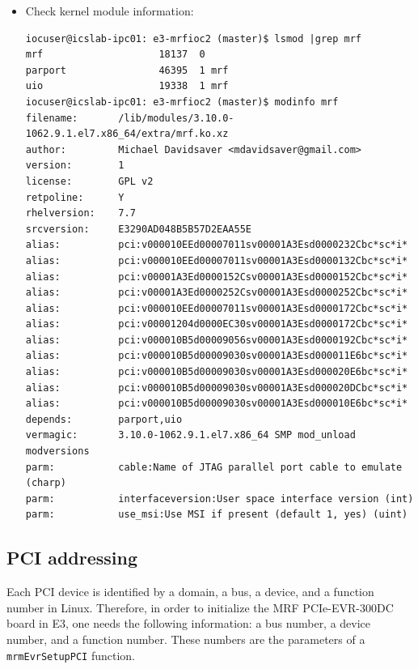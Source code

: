 \documentclass[11pt
  , a4paper
  , article
  , oneside
  , showtrims
]{memoir}
\begin{document}
{\begin{itemize}
\begin{lstlisting}[style=termstyle]
It is OK to see "E3/RULES_DKMS:37: recipe for target 'setup' failed"
---------------------------------------------------------------------
crw-rw-rw- 1 root root 245, 0 Feb 04 15:37 /dev/uio0
crw-rw-rw- 1 root root 245, 1 Feb 04 15:37 /dev/uio1
---------------------------------------------------------------------
\end{lstlisting}
\item Check kernel module information:
\begin{lstlisting}[style=termstyle]
iocuser@icslab-ipc01: e3-mrfioc2 (master)$ lsmod |grep mrf
mrf                    18137  0
parport                46395  1 mrf
uio                    19338  1 mrf
iocuser@icslab-ipc01: e3-mrfioc2 (master)$ modinfo mrf
filename:       /lib/modules/3.10.0-1062.9.1.el7.x86_64/extra/mrf.ko.xz
author:         Michael Davidsaver <mdavidsaver@gmail.com>
version:        1
license:        GPL v2
retpoline:      Y
rhelversion:    7.7
srcversion:     E3290AD048B5B57D2EAA55E
alias:          pci:v000010EEd00007011sv00001A3Esd0000232Cbc*sc*i*
alias:          pci:v000010EEd00007011sv00001A3Esd0000132Cbc*sc*i*
alias:          pci:v00001A3Ed0000152Csv00001A3Esd0000152Cbc*sc*i*
alias:          pci:v00001A3Ed0000252Csv00001A3Esd0000252Cbc*sc*i*
alias:          pci:v000010EEd00007011sv00001A3Esd0000172Cbc*sc*i*
alias:          pci:v00001204d0000EC30sv00001A3Esd0000172Cbc*sc*i*
alias:          pci:v000010B5d00009056sv00001A3Esd0000192Cbc*sc*i*
alias:          pci:v000010B5d00009030sv00001A3Esd000011E6bc*sc*i*
alias:          pci:v000010B5d00009030sv00001A3Esd000020E6bc*sc*i*
alias:          pci:v000010B5d00009030sv00001A3Esd000020DCbc*sc*i*
alias:          pci:v000010B5d00009030sv00001A3Esd000010E6bc*sc*i*
depends:        parport,uio
vermagic:       3.10.0-1062.9.1.el7.x86_64 SMP mod_unload modversions
parm:           cable:Name of JTAG parallel port cable to emulate (charp)
parm:           interfaceversion:User space interface version (int)
parm:           use_msi:Use MSI if present (default 1, yes) (uint)

\end{lstlisting}
\end{itemize}


\subsection{PCI addressing}
Each PCI device is identified by a domain, a bus, a device, and a function number in Linux. Therefore, in order to initialize the MRF PCIe-EVR-300DC board in E3, one needs the following information: a bus number, a device number, and a function number. These numbers are the parameters of a \texttt{mrmEvrSetupPCI} function.\\

}
\end{document}
